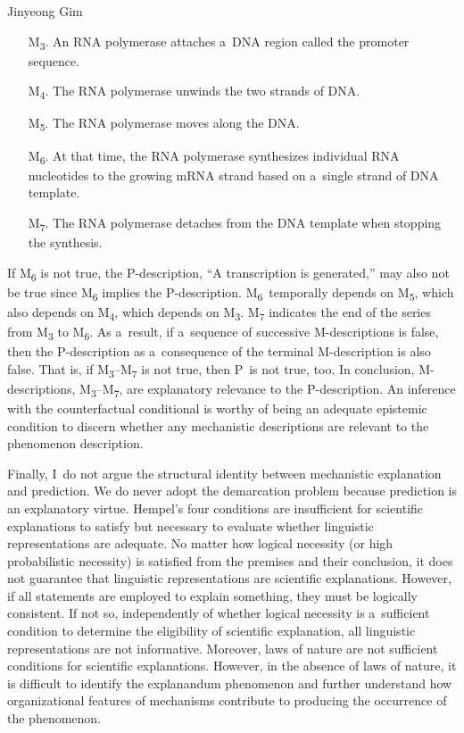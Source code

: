 \begin{artengenv}{Jinyeong Gim}
\begin{itemize}
    \item[M\textsubscript{3}.] An RNA polymerase attaches a~DNA region called the promoter sequence.
    \item[M\textsubscript{4}.] The RNA polymerase unwinds the two strands of DNA.
    \item[M\textsubscript{5}.] The RNA polymerase moves along the DNA.
    \item[M\textsubscript{6}.] At that time, the RNA polymerase synthesizes individual RNA nucleotides to the growing mRNA strand based on a~single strand of DNA template.
    \item[M\textsubscript{7}.] The RNA polymerase detaches from the DNA template when stopping the synthesis.
\end{itemize}
\enlargethispage{1.5\baselineskip}


If M\textsubscript{6} is not true, the P-description, ``A transcription is generated,'' may also not be true since M\textsubscript{6} implies the P-description. M\textsubscript{6}~temporally depends on M\textsubscript{5}, which also depends on M\textsubscript{4}, which depends on M\textsubscript{3}. M\textsubscript{7} indicates the end of the series from M\textsubscript{3} to M\textsubscript{6}. As a~result, if a~sequence of successive M-descriptions is false, then the P-description as a~consequence of the terminal M-description is also false. That is, if M\textsubscript{3}--M\textsubscript{7} is not true, then P~is not true, too. In conclusion, M-descriptions, M\textsubscript{3}--M\textsubscript{7}, are explanatory relevance to the P-description. An inference with the counterfactual conditional is worthy of being an adequate epistemic condition to discern whether any mechanistic descriptions are relevant to the phenomenon description.

Finally, I~do not argue the structural identity between mechanistic explanation and prediction. We do never adopt the demarcation problem because prediction is an explanatory virtue. Hempel's four conditions are insufficient for scientific explanations to satisfy but necessary to evaluate whether linguistic representations are adequate. No matter how logical necessity (or high probabilistic necessity) is satisfied from the premises and their conclusion, it does not guarantee that linguistic representations are scientific explanations. However, if all statements are employed to explain something, they must be logically consistent. If not so, independently of whether logical necessity is a~sufficient condition to determine the eligibility of scientific explanation, all linguistic representations are not informative. Moreover, laws of nature are not sufficient conditions for scientific explanations. However, in the absence of laws of nature, it is difficult to identify the explanandum phenomenon and further understand how organizational features of mechanisms contribute to producing the occurrence of the phenomenon.


\end{artengenv}
